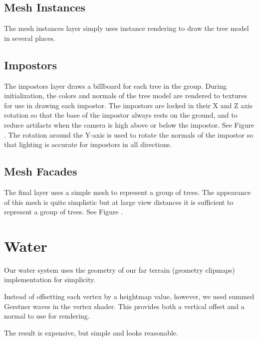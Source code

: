 \subsection{Mesh Instances}

The mesh instances layer simply uses instance rendering to draw the tree model in several places.

\subsection{Impostors}

The impostors layer draws a billboard for each tree in the group.
During initialization, the colors and normals of the tree model are rendered to textures for use in drawing each impostor.
The impostors are locked in their X and Z axis rotation so that the base of the impostor always rests on the ground, and to reduce artifacts when the camera is high above or below the impostor.
See Figure .
The rotation around the Y-axis is used to rotate the normals of the impostor so that lighting is accurate for impostors in all directions.

\subsection{Mesh Facades}

The final layer uses a simple mesh to represent a group of trees.
The appearance of this mesh is quite simplistic but at large view distances it is sufficient to represent a group of trees.
See Figure .

\section{Water} \label{sec:water} %


Our water system uses the geometry of our far terrain (geometry clipmaps) implementation for simplicity.

Instead of offsetting each vertex by a heightmap value, however, we used summed Gerstner waves in the vertex shader.
This provides both a vertical offset and a normal to use for rendering.

The result is expensive, but simple and looks reasonable.


